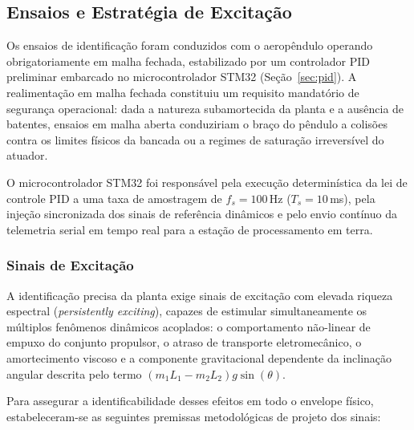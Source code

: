 \subsection{Ensaios e Estratégia de Excitação}
\label{subsec:ensaios}

Os ensaios de identificação foram conduzidos com o aeropêndulo operando obrigatoriamente em malha fechada, estabilizado por um controlador PID preliminar embarcado no microcontrolador STM32 (Seção~\ref{sec:pid}). A realimentação em malha fechada constituiu um requisito mandatório de segurança operacional: dada a natureza subamortecida da planta e a ausência de batentes, ensaios em malha aberta conduziriam o braço do pêndulo a colisões contra os limites físicos da bancada ou a regimes de saturação irreversível do atuador.

O microcontrolador STM32 foi responsável pela execução determinística da lei de controle PID a uma taxa de amostragem de $f_s = 100$\,Hz ($T_s = 10$\,ms), pela injeção sincronizada dos sinais de referência dinâmicos e pelo envio contínuo da telemetria serial em tempo real para a estação de processamento em terra.

\subsubsection{Sinais de Excitação}

A identificação precisa da planta exige sinais de excitação com elevada riqueza espectral (\textit{persistently exciting}), capazes de estimular simultaneamente os múltiplos fenômenos dinâmicos acoplados: o comportamento não-linear de empuxo do conjunto propulsor, o atraso de transporte eletromecânico, o amortecimento viscoso e a componente gravitacional dependente da inclinação angular descrita pelo termo $(m_1 L_1 - m_2 L_2)g\sin(\theta)$.

Para assegurar a identificabilidade desses efeitos em todo o envelope físico, estabeleceram-se as seguintes premissas metodológicas de projeto dos sinais:

